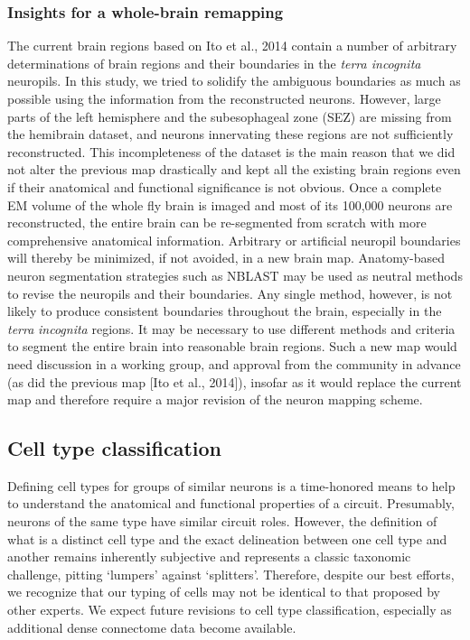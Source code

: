 \documentclass{article}
\begin{document}
\subsubsection*{Insights for a whole-brain remapping}

The current brain regions based on Ito et al., 2014 contain a number of arbitrary determinations of brain regions and their boundaries in the \emph{terra incognita} neuropils. In this study, we tried to solidify the ambiguous boundaries as much as possible using the information from the reconstructed neurons. However, large parts of the left hemisphere and the subesophageal zone (SEZ) are missing from the hemibrain dataset, and neurons innervating these regions are not sufficiently reconstructed. This incompleteness of the dataset is the main reason that we did not alter the previous map drastically and kept all the existing brain regions even if their anatomical and functional significance is not obvious. Once a complete EM volume of the whole fly brain is imaged and most of its 100,000 neurons are reconstructed, the entire brain can be re-segmented from scratch with more comprehensive anatomical information. Arbitrary or artificial neuropil boundaries will thereby be minimized, if not avoided, in a new brain map. Anatomy-based neuron segmentation strategies such as NBLAST may be used as neutral methods to revise the neuropils and their boundaries. Any single method, however, is not likely to produce consistent boundaries throughout the brain, especially in the \emph{terra} \emph{incognita} regions. It may be necessary to use different methods and criteria to segment the entire brain into reasonable brain regions. Such a new map would need discussion in a working group, and approval from the community in advance (as did the previous map [Ito et al., 2014]), insofar as it would replace the current map and therefore require a major revision of the neuron mapping scheme.

\subsection*{Cell type classification}

Defining cell types for groups of similar neurons is a time-honored means to help to understand the anatomical and functional properties of a circuit. Presumably, neurons of the same type have similar circuit roles. However, the definition of what is a distinct cell type and the exact delineation between one cell type and another remains inherently subjective and represents a classic taxonomic challenge, pitting ‘lumpers’ against ‘splitters’. Therefore, despite our best efforts, we recognize that our typing of cells may not be identical to that proposed by other experts. We expect future revisions to cell type classification, especially as additional dense connectome data become available.
\end{document}
